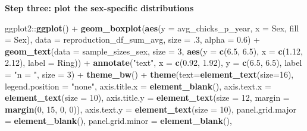 \documentclass[]{article}
\newenvironment{Shaded}{\begin{snugshade}}{\end{snugshade}}
\newcommand{\KeywordTok}[1]{\textcolor[rgb]{0.13,0.29,0.53}{\textbf{{#1}}}}
\newcommand{\DataTypeTok}[1]{\textcolor[rgb]{0.13,0.29,0.53}{{#1}}}
\newcommand{\DecValTok}[1]{\textcolor[rgb]{0.00,0.00,0.81}{{#1}}}
\newcommand{\FloatTok}[1]{\textcolor[rgb]{0.00,0.00,0.81}{{#1}}}
\newcommand{\StringTok}[1]{\textcolor[rgb]{0.31,0.60,0.02}{{#1}}}
\newcommand{\NormalTok}[1]{{#1}}
\begin{document}
\textbf{Step three: plot the sex-specific distributions}

\begin{Shaded}
\begin{Highlighting}[]
\NormalTok{ggplot2::}\KeywordTok{ggplot}\NormalTok{() +}
\StringTok{  }\KeywordTok{geom_boxplot}\NormalTok{(}\KeywordTok{aes}\NormalTok{(}\DataTypeTok{y =} \NormalTok{avg_chicks_p_year, }\DataTypeTok{x =} \NormalTok{Sex, }\DataTypeTok{fill =} \NormalTok{Sex), }
               \DataTypeTok{data =} \NormalTok{reproduction_df_sum_avg, }\DataTypeTok{size =} \NormalTok{.}\DecValTok{3}\NormalTok{, }\DataTypeTok{alpha =} \FloatTok{0.6}\NormalTok{) +}
\StringTok{  }\KeywordTok{geom_text}\NormalTok{(}\DataTypeTok{data =} \NormalTok{sample_sizes_sex, }\DataTypeTok{size =} \DecValTok{3}\NormalTok{, }
            \KeywordTok{aes}\NormalTok{(}\DataTypeTok{y =} \KeywordTok{c}\NormalTok{(}\FloatTok{6.5}\NormalTok{, }\FloatTok{6.5}\NormalTok{), }\DataTypeTok{x =} \KeywordTok{c}\NormalTok{(}\FloatTok{1.12}\NormalTok{, }\FloatTok{2.12}\NormalTok{), }\DataTypeTok{label =} \NormalTok{Ring)) +}
\StringTok{  }\KeywordTok{annotate}\NormalTok{(}\StringTok{"text"}\NormalTok{, }\DataTypeTok{x =} \KeywordTok{c}\NormalTok{(}\FloatTok{0.92}\NormalTok{, }\FloatTok{1.92}\NormalTok{), }\DataTypeTok{y =} \KeywordTok{c}\NormalTok{(}\FloatTok{6.5}\NormalTok{, }\FloatTok{6.5}\NormalTok{), }\DataTypeTok{label =} \StringTok{"n = "}\NormalTok{, }
           \DataTypeTok{size =} \DecValTok{3}\NormalTok{) +}
\StringTok{  }\KeywordTok{theme_bw}\NormalTok{() +}
\StringTok{  }\KeywordTok{theme}\NormalTok{(}\DataTypeTok{text=}\KeywordTok{element_text}\NormalTok{(}\DataTypeTok{size=}\DecValTok{16}\NormalTok{),}
        \DataTypeTok{legend.position =} \StringTok{"none"}\NormalTok{,}
        \DataTypeTok{axis.title.x =} \KeywordTok{element_blank}\NormalTok{(),}
        \DataTypeTok{axis.text.x  =} \KeywordTok{element_text}\NormalTok{(}\DataTypeTok{size =} \DecValTok{10}\NormalTok{), }
        \DataTypeTok{axis.title.y =} \KeywordTok{element_text}\NormalTok{(}\DataTypeTok{size =} \DecValTok{12}\NormalTok{, }
                                    \DataTypeTok{margin =} \KeywordTok{margin}\NormalTok{(}\DecValTok{0}\NormalTok{, }\DecValTok{15}\NormalTok{, }\DecValTok{0}\NormalTok{, }\DecValTok{0}\NormalTok{)),}
        \DataTypeTok{axis.text.y =} \KeywordTok{element_text}\NormalTok{(}\DataTypeTok{size =} \DecValTok{10}\NormalTok{), }
        \DataTypeTok{panel.grid.major =} \KeywordTok{element_blank}\NormalTok{(),}
        \DataTypeTok{panel.grid.minor =} \KeywordTok{element_blank}\NormalTok{(),}

\end{Highlighting}
\end{Shaded}
\end{document}
